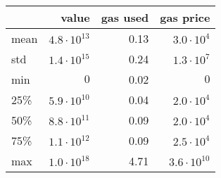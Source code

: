 \begin{tabular}{lrrr}
\toprule
{} &         value  &    gas used &     gas price \\
\midrule
mean    &  $4.8\cdot 10^{13}$  &        0.13  &  $3.0\cdot 10^4$ \\
std     &  $1.4\cdot 10^{15}$  &        0.24  &  $1.3\cdot 10^7$ \\
min     &  $0$               &        0.02  &  $0$ \\
25\%    &  $5.9\cdot 10^{10}$  &        0.04  &  $2.0\cdot 10^4$ \\
50\%    &  $8.8\cdot 10^{11}$  &        0.09  &  $2.0\cdot 10^4$ \\
75\%    &  $1.1\cdot 10^{12}$  &        0.09  &  $2.5\cdot 10^4$ \\
max     &  $1.0\cdot 10^{18}$  &        4.71  &  $3.6 \cdot 10^{10}$ \\
\bottomrule
\end{tabular}
